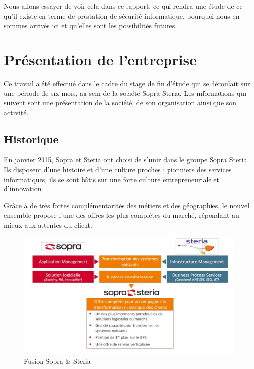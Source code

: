 \documentclass[a4paper]{memoir}
\begin{document}
Nous allons essayer de voir cela dans ce rapport, ce qui rendra une étude de ce qu'il existe en terme de prestation de sécurité informatique, pourquoi nous en sommes arrivés ici et qu'elles sont les possibilités futures.



\chapter*{Présentation de l'entreprise}

Ce travail a été effectué dans le cadre du stage de fin d'étude qui se déroulait sur une période de six mois, au sein de la société Sopra Steria.
Les informations qui suivent sont une présentation de la société, de son organisation ainsi que son activité.

\section*{Historique}

En janvier 2015, Sopra et Steria ont choisi de s’unir dans le groupe Sopra Steria. Ils disposent d’une histoire et d’une culture proches : pionniers des services informatiques, ils se sont bâtis sur une forte culture entrepreneuriale et d’innovation.

Grâce à de très fortes complémentarités des métiers et des géographies, le nouvel ensemble propose l’une des offres les plus complètes du marché, répondant au mieux aux attentes du client. 

\begin{figure}[!ht]
\center
\includegraphics[width=1\textwidth]{./images/sopra1.png}
\caption{Fusion Sopra \& Steria}
\label{Sopra+Steria}
\end{figure}
\end{document}
